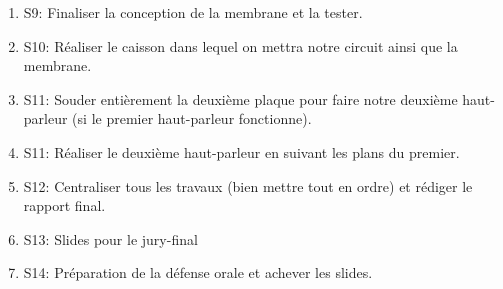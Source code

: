 \begin{enumerate}
	\item{S9}: Finaliser la conception de la membrane et la tester.
	\item{S10}: Réaliser le caisson dans lequel on mettra notre circuit ainsi que la membrane.
	\item{S11}: Souder entièrement la deuxième plaque pour faire notre deuxième haut-parleur (si le premier haut-parleur fonctionne).
	\item{S11}: Réaliser le deuxième haut-parleur en suivant les plans du premier.
	\item{S12}: Centraliser tous les travaux (bien mettre tout en ordre) et rédiger le rapport final.
	\item{S13}: Slides pour le jury-final
	\item{S14}: Préparation de la défense orale et achever les slides.
\end{enumerate}


